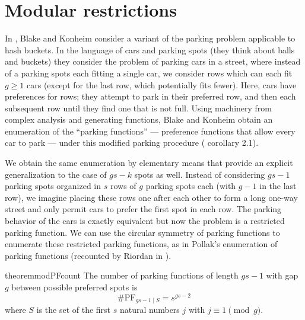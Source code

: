 \documentclass[12 pt]{amsart}
\theoremstyle{definition} %
\theoremstyle{remark} %
\begin{document}
\section{Modular restrictions \label{modularsection}}

In \cite{blake-konheim-1977}, Blake and Konheim consider a variant of the parking problem applicable to hash buckets. In the language of cars and parking spots (they think about balls and buckets) they consider the problem of parking cars in a street, where instead of a parking spots each fitting a single car, we consider rows which can each fit $g\ge 1$ cars (except for the last row, which potentially fits fewer). Here, cars have preferences for rows; they attempt to park in their preferred row, and then each subsequent row until they find one that is not full. Using machinery from complex analysis and generating functions, Blake and Konheim obtain an enumeration of the ``parking functions'' --- preference functions that allow every car to park --- under this modified parking procedure (\cite{blake-konheim-1977} corollary 2.1).

We obtain the same enumeration by elementary means that provide an explicit generalization to the case of $gs - k$ spots as well. Instead of considering $gs - 1$ parking spots organized in $s$ rows of $g$ parking spots each (with $g - 1$ in the last row), we imagine placing these rows one after each other to form a long one-way street and only permit cars to prefer the first spot in each row. The parking behavior of the cars is exactly equivalent but now the problem is a restricted parking function. We can use the circular symmetry of parking functions to enumerate these restricted parking functions, as in Pollak's enumeration of parking functions (recounted by Riordan in \cite{riordan-1969}). 

\begin{restatable}{theorem}{modPFcount}
	\label{thm:modPFcount}
	The number of parking functions of length $gs - 1$ with gap $g$ between possible preferred spots is
	\[
		\# \mathrm{PF}_{gs - 1 \mid S} = s^{gs - 2}
	\]
	where $S$ is the set of the first $s$ natural numbers $j$ with $j \equiv 1 \pmod g$.
\end{restatable}
\end{document}

